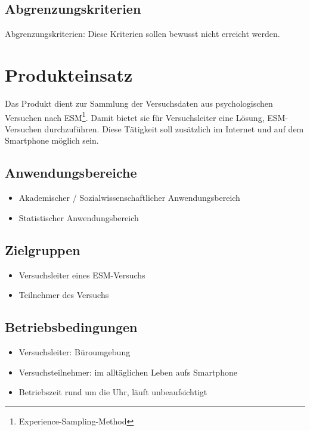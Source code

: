 \documentclass[a4paper]{scrreprt}
\begin{document}
        \section{Abgrenzungskriterien}
            Abgrenzungskriterien: Diese Kriterien sollen bewusst nicht erreicht werden.
 
    \chapter{Produkteinsatz}
        Das Produkt dient zur Sammlung der Versuchsdaten aus psychologischen Versuchen nach ESM\footnote{Experience-Sampling-Method}. Damit bietet sie für Versuchsleiter eine Lösung, ESM-Versuchen durchzuführen. Diese Tätigkeit soll zusätzlich im Internet und auf dem Smartphone möglich sein.
 
        \section{Anwendungsbereiche}
            \begin{itemize}
                \item Akademischer / Sozialwissenschaftlicher Anwendungsbereich
                \item Statistischer Anwendungsbereich
            \end{itemize}
 
        \section{Zielgruppen}
            \begin{itemize}
                \item Versuchsleiter eines ESM-Versuchs
                \item Teilnehmer des Versuchs
            \end{itemize}
 
        \section{Betriebsbedingungen}
            \begin{itemize}
                \item Versuchsleiter: Büroumgebung
                \item Versuchsteilnehmer: im alltäglichen Leben aufs Smartphone
                \item Betriebszeit rund um die Uhr, läuft unbeaufsichtigt
            \end{itemize}
 
\end{document}
